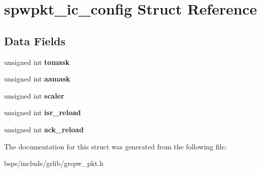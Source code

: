 \hypertarget{structspwpkt__ic__config}{}\section{spwpkt\+\_\+ic\+\_\+config Struct Reference}
\label{structspwpkt__ic__config}
\subsection*{Data Fields}
\begin{DoxyCompactItemize}
\item 
\mbox{\label{structspwpkt__ic__config_ab85e322f71d3514aabe23fc85081989d}} 
unsigned int {\bfseries tomask}
\item 
\mbox{\label{structspwpkt__ic__config_a155a6f4629eb0107902c4ef8f86fe0f2}} 
unsigned int {\bfseries aamask}
\item 
\mbox{\label{structspwpkt__ic__config_a9b5574521b9f1c6f77eb5b17c967fccd}} 
unsigned int {\bfseries scaler}
\item 
\mbox{\label{structspwpkt__ic__config_a95a6d89b0135e2648ebc3c6c234da3d6}} 
unsigned int {\bfseries isr\+\_\+reload}
\item 
\mbox{\label{structspwpkt__ic__config_a5da10f998d3d9f32b49e9896ca1bae3d}} 
unsigned int {\bfseries ack\+\_\+reload}
\end{DoxyCompactItemize}


The documentation for this struct was generated from the following file\+:\begin{DoxyCompactItemize}
\item 
bsps/include/grlib/grspw\+\_\+pkt.\+h\end{DoxyCompactItemize}
